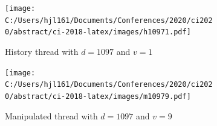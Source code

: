 \documentclass[9pt,a4paper,twocolumn,lineno]{article}
\begin{document}
\begin{figure}[!h]
	\centering
	\begin{subfigure}{.44\linewidth}
		\centering
		\texttt{[image: C:/Users/hjl161/Documents/Conferences/2020/ci2020/abstract/ci-2018-latex/images/h10971.pdf]}
		\caption{\footnotesize History thread with $d=1097$ and $v=1$}
		\label{fig: h=history d=1097, v=1}
	\end{subfigure}
	\begin{subfigure}{.44\linewidth}
		\centering
		\texttt{[image: C:/Users/hjl161/Documents/Conferences/2020/ci2020/abstract/ci-2018-latex/images/m10979.pdf]}
		\caption{\footnotesize Manipulated thread with $d=1097$ and $v=9$}
		\label{fig: h=max d=1097, v=9}
	\end{subfigure}
	\begin{subfigure}{.1\linewidth}
		\centering

\end{subfigure}
\end{figure}
\end{document}
